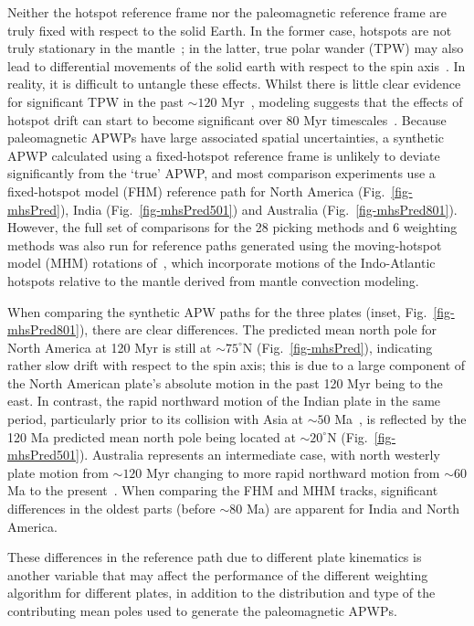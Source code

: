 Neither the hotspot reference frame nor the paleomagnetic reference frame are
truly fixed with respect to the solid Earth. In the former case, hotspots are
not truly stationary in the mantle~\citep{S98}; in the latter, true polar wander
(TPW) may also lead to differential movements of the solid earth with respect to
the spin axis~\citep{E03}. In reality, it is difficult to untangle these
effects. Whilst there is little clear evidence for significant TPW in the past
${\sim}120$ Myr~\citep{C00,R04}, modeling suggests that the effects of hotspot
drift can start to become significant over 80 Myr
timescales~\citep{O05}. Because paleomagnetic APWPs have large associated
spatial uncertainties, a synthetic APWP calculated using a fixed-hotspot
reference frame is unlikely to deviate significantly from the `true' APWP, and
most comparison experiments use a fixed-hotspot model (FHM) reference path for
North America (Fig.~\ref{fig-mhsPred}), India (Fig.~\ref{fig-mhsPred501}) and
Australia (Fig.~\ref{fig-mhsPred801}). However, the full set of comparisons for
the 28 picking methods and 6 weighting methods was also run for reference paths
generated using the moving-hotspot model (MHM) rotations of~\citet{O05}, which
incorporate motions of the Indo-Atlantic hotspots relative to the mantle derived
from mantle convection modeling.

When comparing the synthetic APW paths for the three plates (inset,
Fig.~\ref{fig-mhsPred801}), there are clear differences. The predicted mean
north pole for North America at 120 Myr is still at ${\sim}75^{\circ}$N
(Fig.~\ref{fig-mhsPred}), indicating rather slow drift with respect to the spin
axis; this is due to a large component of the North American plate's absolute
motion in the past 120 Myr being to the east. In contrast, the rapid northward
motion of the Indian plate in the same period, particularly prior to its
collision with Asia at ${\sim}50$ Ma~\citep{N10}, is reflected by
the 120 Ma predicted mean north pole being located at ${\sim}20^{\circ}$N
(Fig.~\ref{fig-mhsPred501}). Australia represents an intermediate case, with
north westerly plate motion from ${\sim}120$ Myr changing to more
rapid northward motion from ${\sim}60$ Ma to the present~\citep{W07}.
When comparing the FHM and MHM tracks, significant differences in the oldest
parts (before ${\sim}80$ Ma) are apparent for India and North America.

These differences in the reference path due to different plate kinematics is
another variable that may affect the performance of the different weighting
algorithm for different plates, in addition to the distribution and type of the
contributing mean poles used to generate the paleomagnetic APWPs.

